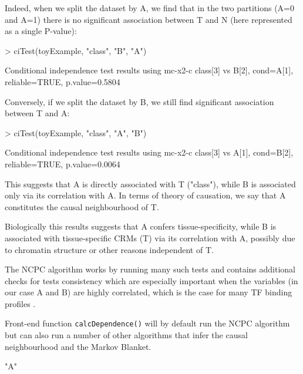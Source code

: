 \documentclass{article}
\newcommand{\Rfun}[1]{{\texttt{#1}}}
\begin{document}
Indeed, when we split the dataset by A, we find that in the two partitions (A=0 and A=1) there is no significant association between T and N (here represented as a single P-value):

\begin{Schunk}
\begin{Sinput}
> ciTest(toyExample, "class", "B", "A")
\end{Sinput}
\begin{Soutput}
Conditional independence test results using mc-x2-c 
  class[3] vs B[2], cond=A[1], reliable=TRUE, p.value=0.5804
\end{Soutput}
\end{Schunk}

Conversely, if we split the dataset by B, we still find significant association between T and A:

\begin{Schunk}
\begin{Sinput}
> ciTest(toyExample, "class", "A", "B")
\end{Sinput}
\begin{Soutput}
Conditional independence test results using mc-x2-c 
  class[3] vs A[1], cond=B[2], reliable=TRUE, p.value=0.0064
\end{Soutput}
\end{Schunk}

This suggests that A is directly associated with T ("class"), while B is associated only via its correlation with A. In terms of theory of causation, we say that A constitutes the causal neighbourhood of T.

Biologically this results suggests that A confers tissue-specificity, while B is associated with tissue-specific CRMs (T) via its correlation with A, possibly due to chromatin structure or other reasons independent of T. 

The NCPC algorithm works by running many such tests and contains additional checks for tests consistency which are especially important when the variables (in our case A and B) are highly correlated, which is the case for many TF binding profiles \citep{stojnic_2012}. 

Front-end function \Rfun{calcDependence()} will by default run the NCPC algorithm but can also run a number of other algorithms that infer the causal neighbourhood and the Markov Blanket.

\begin{Schunk}
\begin{Soutput}
[1] "A"
\end{Soutput}
\end{Schunk}
\end{document}
